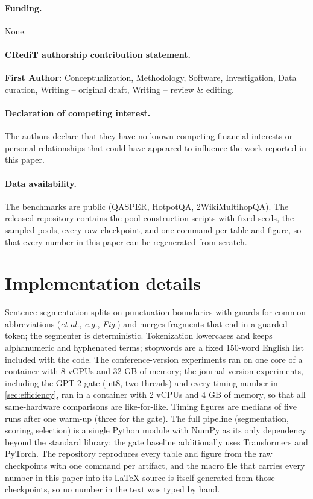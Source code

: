 \documentclass[preprint,12pt]{elsarticle}
\theoremstyle{remark}
\begin{document}
\paragraph{Funding.} None.

\paragraph{CRediT authorship contribution statement.}
\textbf{First Author:} Conceptualization, Methodology, Software,
Investigation, Data curation, Writing -- original draft, Writing --
review \& editing.

\paragraph{Declaration of competing interest.}
The authors declare that they have no known competing financial
interests or personal relationships that could have appeared to
influence the work reported in this paper.

\paragraph{Data availability.}
The benchmarks are public (QASPER, HotpotQA, 2WikiMultihopQA). The
released repository contains the pool-construction scripts with fixed
seeds, the sampled pools, every raw checkpoint, and one command per
table and figure, so that every number in this paper can be
regenerated from scratch.




\appendix

\section{Implementation details}
\label{app:impl}
Sentence segmentation splits on punctuation boundaries with guards
for common abbreviations (\emph{et al.}, \emph{e.g.}, \emph{Fig.}) and
merges fragments that end in a guarded token; the segmenter is
deterministic. Tokenization lowercases and keeps alphanumeric and
hyphenated terms; stopwords are a fixed 150-word English list
included with the code. The conference-version experiments ran on one
core of a container with 8 vCPUs and 32 GB of memory; the
journal-version experiments, including the GPT-2 gate (int8, two
threads) and every timing number in \autoref{sec:efficiency}, ran in
a container with 2 vCPUs and 4 GB of memory, so that all
same-hardware comparisons are like-for-like. Timing figures are
medians of five runs after one warm-up (three for the gate). The full
pipeline (segmentation, scoring, selection) is a single Python module
with NumPy as its only dependency beyond the standard library; the
gate baseline additionally uses Transformers and PyTorch. The
repository reproduces every table and figure from the raw checkpoints
with one command per artifact, and the macro file that carries every
number in this paper into its LaTeX source is itself generated from
those checkpoints, so no number in the text was typed by hand.
\end{document}
